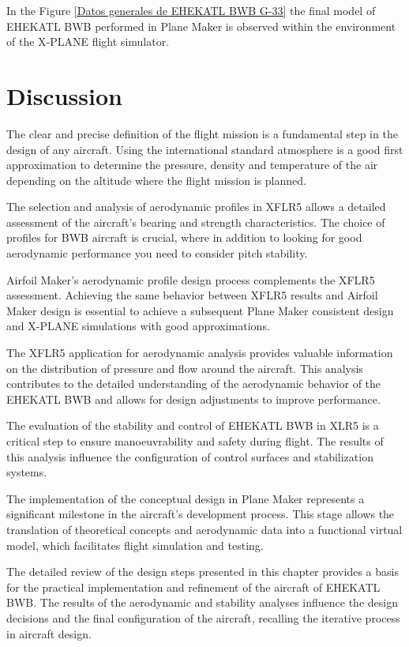 In the Figure \ref{Datos generales de EHEKATL BWB G-33} the final model of EHEKATL BWB performed in Plane Maker is observed within the environment of the X-PLANE flight simulator. 

\section{Discussion}

The clear and precise definition of the flight mission is a fundamental step in the design of any aircraft. Using the international standard atmosphere is a good first approximation to determine the pressure, density and temperature of the air depending on the altitude where the flight mission is planned. 

The selection and analysis of aerodynamic profiles in XFLR5 allows a detailed assessment of the aircraft's bearing and strength characteristics. The choice of profiles for BWB aircraft is crucial, where in addition to looking for good aerodynamic performance you need to consider pitch stability. 

Airfoil Maker's aerodynamic profile design process complements the XFLR5 assessment. Achieving the same behavior between XFLR5 results and Airfoil Maker design is essential to achieve a subsequent Plane Maker consistent design and X-PLANE simulations with good approximations. 

The XFLR5 application for aerodynamic analysis provides valuable information on the distribution of pressure and flow around the aircraft. This analysis contributes to the detailed understanding of the aerodynamic behavior of the EHEKATL BWB and allows for design adjustments to improve performance.

The evaluation of the stability and control of EHEKATL BWB in XLR5 is a critical step to ensure manoeuvrability and safety during flight. The results of this analysis influence the configuration of control surfaces and stabilization systems.

The implementation of the conceptual design in Plane Maker represents a significant milestone in the aircraft's development process. This stage allows the translation of theoretical concepts and aerodynamic data into a functional virtual model, which facilitates flight simulation and testing.

The detailed review of the design steps presented in this chapter provides a basis for the practical implementation and refinement of the aircraft of EHEKATL BWB. The results of the aerodynamic and stability analyses influence the design decisions and the final configuration of the aircraft, recalling the iterative process in aircraft design. 
















